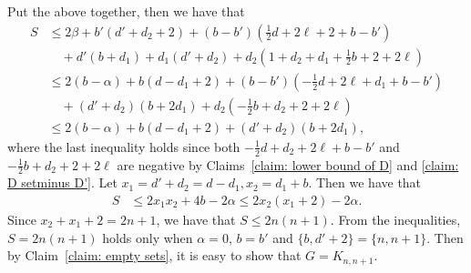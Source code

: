 \documentclass[12pt]{article}%
\begin{document}
Put the above together, then we have that
\begin{equation*}
\begin{aligned}
	S &\le 2\beta + b'(d' + d_2 +2) + (b-b')\left(\frac{1}{2}d + 2\ell+ 2 + b-b'\right) \\
	&\quad + d'(b+d_1) + d_1(d'+d_2) + d_2\left(1 + d_2 + d_1 + \frac{1}{2}b + 2 + 2\ell\right)\\
	& \le 2(b-\alpha) + b(d - d_1 +2) + (b-b') \left(-\frac{1}{2}d + 2\ell + d_1 + b-b'\right)  \\
	& \quad + (d'+d_2)(b+2d_1) + d_2\left(-\frac{1}{2}b + d_2 +2+2\ell\right) \\
	& \le 2(b-\alpha) + b(d - d_1 +2) + (d'+d_2)(b+2d_1),
\end{aligned}
\end{equation*}
where the last inequality holds since both $-\frac{1}{2}d + d_2 + 2\ell + b-b'$ and $-\frac{1}{2}b + d_2 + 2 + 2\ell$ are negative by Claims~\ref{claim: lower bound of D} and \ref{claim: D setminus D'}.
Let $x_1 = d' +d_2 = d-d_1, x_2 = d_1 + b$. Then we have that
\begin{equation*}
\begin{aligned}
	S & \le 2x_1 x_2 + 4b -2\alpha
	 \le 2x_2(x_1+2) - 2\alpha.
\end{aligned}
\end{equation*}
Since $x_2 + x_1 + 2 = 2n+1$, we have that $S \le 2n(n+1)$.
From the inequalities, $S = 2n(n+1)$ holds only when $\alpha =0$, $b=b'$ and $\{b, d'+2\} = \{n,n+1\}$.
Then by Claim~\ref{claim: empty sets}, it is easy to show that $G=K_{n,n+1}$.





\end{document}

